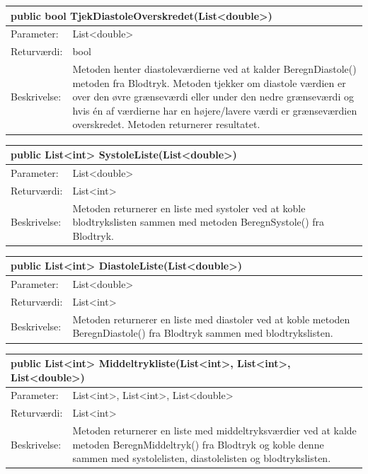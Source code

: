 \begin{table}[H]
\label{tab:tabel2}
\begin{tabular}{| l | p{13cm} |}
   \hline
   \multicolumn{2}{|l|}{public bool TjekDiastoleOverskredet(List<double>)} \\ \hline
   Parameter: & List<double>\\ \hline
   Returværdi: & bool\\ \hline
   Beskrivelse: & Metoden henter diastoleværdierne ved at kalder BeregnDiastole() metoden fra Blodtryk. Metoden tjekker om diastole værdien er over den øvre grænseværdi eller under den nedre grænseværdi og hvis én af værdierne har en højere/lavere værdi er grænseværdien overskredet. Metoden returnerer resultatet. \\ \hline
\end{tabular}
\end{table}
\begin{table}[H]
\label{tab:tabel2}
\begin{tabular}{| l | p{13cm} |}
   \hline
   \multicolumn{2}{|l|}{public List<int> SystoleListe(List<double>)} \\ \hline
   Parameter: & List<double>\\ \hline
   Returværdi: & List<int>\\ \hline
   Beskrivelse: &  Metoden returnerer en liste med systoler ved at koble blodtrykslisten sammen med metoden BeregnSystole() fra Blodtryk.\\ \hline
\end{tabular}
\end{table}
\begin{table}[H]
\label{tab:tabel2}
\begin{tabular}{| l | p{13cm} |}
   \hline
   \multicolumn{2}{|l|}{public List<int> DiastoleListe(List<double>)} \\ \hline
   Parameter: & List<double>\\ \hline
   Returværdi: & List<int>\\ \hline
   Beskrivelse: &  Metoden returnerer en liste med diastoler ved at koble metoden BeregnDiastole() fra Blodtryk sammen med blodtrykslisten.\\ \hline
\end{tabular}
\end{table}
\begin{table}[H]
\label{tab:tabel2}
\begin{tabular}{| l | p{13cm} |}
   \hline
   \multicolumn{2}{|l|}{public List<int> Middeltrykliste(List<int>, List<int>, List<double>)} \\ \hline
   Parameter: & List<int>, List<int>, List<double>\\ \hline
   Returværdi: & List<int>\\ \hline
   Beskrivelse: &  Metoden returnerer en liste med middeltryksværdier ved at kalde metoden BeregnMiddeltryk() fra Blodtryk og koble denne sammen med systolelisten, diastolelisten og blodtrykslisten.\\ \hline
\end{tabular}
\end{table}
